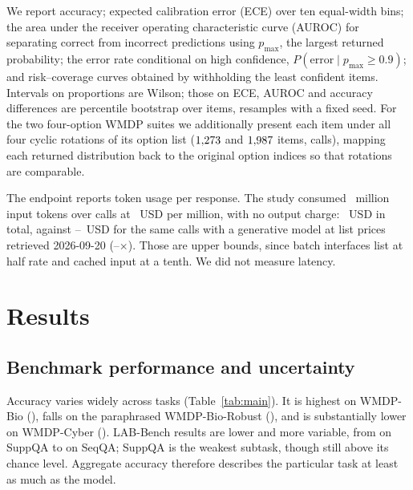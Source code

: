 \documentclass[conference,compsoc]{IEEEtran}
\newcommand{\pmax}{p_{\max}}
\begin{document}
We report accuracy; expected calibration error (ECE) over ten equal-width bins; the area
under the receiver operating characteristic curve (AUROC) for separating correct from
incorrect predictions using $\pmax$, the largest returned probability; the error rate
conditional on high confidence, $P(\text{error} \mid \pmax \geq 0.9)$; and risk--coverage
curves obtained by withholding the least confident items. Intervals on proportions are
Wilson; those on ECE, AUROC and accuracy differences are percentile bootstrap over items,
\statNBootCI{} resamples with a fixed seed. For the two four-option WMDP suites we
additionally present each item under all four cyclic rotations of its option list
($1{,}273{}$ and $1{,}987{}$ items, \statNCallsCircular{} calls),
mapping each returned distribution back to the original option indices so that rotations
are comparable.

The endpoint reports token usage per response. The study consumed
\statInputTokens{}~million input tokens over \statNCallsTotal{} calls at
\statUsdPerM{}~USD per million, with no output charge: \statUsdTotal{}~USD in total,
against \statLlmCheapUsd{}--\statLlmTopUsd{}~USD for the same calls with a generative
model at list prices retrieved 2026-09-20
(\statLlmCheapRatio{}--\statLlmTopRatio{}$\times$). Those are upper bounds, since batch
interfaces list at half rate and cached input at a tenth. We did not measure latency.



\section{Results}

\subsection{Benchmark performance and uncertainty}
\label{sec:uncertainty}

Accuracy varies widely across tasks (Table~\ref{tab:main}). It is highest on WMDP-Bio
(\statAccBio{}), falls on the paraphrased WMDP-Bio-Robust (\statAccBioRobust{}), and is
substantially lower on WMDP-Cyber (\statAccCyber{}). LAB-Bench results are lower and more variable, from \statLabMin{} on SuppQA to
\statLabMax{} on SeqQA; SuppQA is the weakest subtask, though still above its
\statChanceSupp{} chance level. Aggregate accuracy therefore describes the
particular task at least as much as the model.
\end{document}
